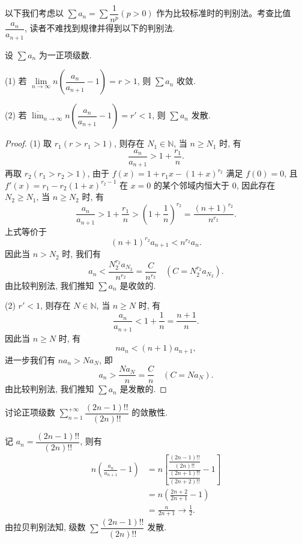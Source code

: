 以下我们考虑以 $\sum a_n=\sum\dfrac1{n^p}(p>0)$ 作为比较标准时的判别法。考查比值 $\dfrac{a_n}{a_{n+1}}$, 读者不难找到规律并得到以下的判别法.

\begin{theorem}\label{theorem:ma-9-2-5}
设 $\sum a_n$ 为一正项级数.

(1) 若 $\lim\limits_{n\to\infty}n\left(\dfrac{a_n}{a_{n+1}}-1\right)=r>1$, 则 $\sum a_n$ 收敛.

(2) 若 $\overline{\lim}_{n\to\infty}n\left(\dfrac{a_n}{a_{n+1}}-1\right)=r'<1$, 则 $\sum a_n$ 发散.
\end{theorem}


\begin{proof}
(1) 取 $r_1(r>r_1>1)$, 则存在 $N_1\in\mathbb{N}$, 当 $n\geq N_1$ 时, 有
\[
  \frac{a_n}{a_{n+1}}>1+\frac{r_1}{n}.
\]
再取 $r_2(r_1>r_2>1)$, 由于 $f(x)=1+r_1x-(1+x)^{r_2}$ 满足 $f(0)=0$, 且 $f'(x)=r_1-r_2(1+x)^{r_2-1}$ 在 $x=0$ 的某个邻域内恒大于 0, 因此存在 $N_2\geq N_1$, 当 $n\geq N_2$ 时, 有
\[
  \frac{a_n}{a_{n+1}}>1+\frac{r_1}{n}>\left(1+\frac1n\right)^{r_2}
  =\frac{(n+1)^{r_2}}{n^{r_2}}.
\]
上式等价于
\[
  (n+1)^{r_2}a_{n+1}<n^{r_2}a_n.
\]
因此当 $n>N_2$ 时, 我们有
\[
  a_n<\frac{N_2^{r_2}a_{N_2}}{n^{r_2}}=\frac{C}{n^{r_2}}\quad(C=N_2^{r_2}a_{N_2}).
\]
由比较判别法, 我们推知 $\sum a_n$ 是收敛的.

(2) $r'<1$, 则存在 $N\in\mathbb{N}$, 当 $n\geq N$ 时, 有
\[
  \frac{a_n}{a_{n+1}}<1+\frac1n=\frac{n+1}{n}.
\]
因此当 $n\geq N$ 时, 有
\[
  na_n<(n+1)a_{n+1},
\]
进一步我们有 $na_n>Na_N$, 即
\[
  a_n>\frac{Na_N}{n}=\frac{C}{n}\quad(C=Na_N).
\]
由比较判别法, 我们推知 $\sum a_n$ 是发散的.
\end{proof}


\begin{example}\label{example:ma-9-2-9}
讨论正项级数 $\sum\limits_{n=1}^{+\infty}\dfrac{(2n-1)!!}{(2n)!!}$ 的敛散性.
\end{example}


\begin{solve}
记 $a_n=\dfrac{(2n-1)!!}{(2n)!!}$, 则有
\[
\begin{aligned}
  n\left(\frac{a_n}{a_{n+1}}-1\right)
  &=n\left[\frac{\dfrac{(2n-1)!!}{(2n)!!}}{\dfrac{(2n+1)!!}{(2n+2)!!}}-1\right]\\
  &=n\left(\frac{2n+2}{2n+1}-1\right)\\
  &=\frac{n}{2n+1}\to\frac12.
\end{aligned}
\]
由拉贝判别法知, 级数 $\sum\dfrac{(2n-1)!!}{(2n)!!}$ 发散.
\end{solve}


